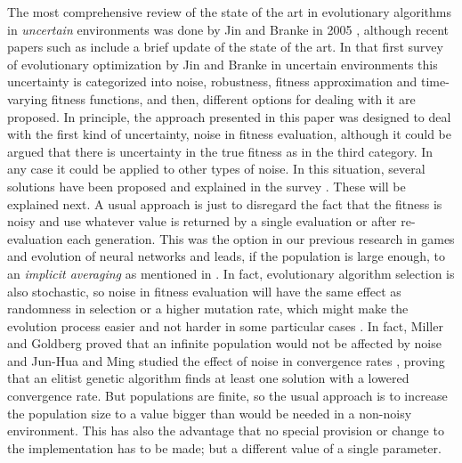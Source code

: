 \documentclass{llncs}
\begin{document}
The most comprehensive review of the state of the art in evolutionary
algorithms in {\em uncertain} environments 
was done by Jin and Branke in 2005 \cite{Jin2005303}, although recent papers such as \cite{DBLP:journals/corr/QianYZ13} include a brief update of the state
of the art. In that first survey 
of evolutionary optimization by Jin and Branke  in
uncertain environments this uncertainty is categorized into noise,
robustness, fitness approximation and time-varying fitness functions, and then,
different options for dealing with it are proposed. In principle, the
approach presented in this paper was designed to deal with the first kind of
uncertainty, noise in fitness evaluation, although it could be argued
that there is uncertainty in the true fitness as in the third
category. In any case it could be applied to
other types of noise. In this situation, several solutions have been
proposed and explained in the survey \cite{Jin2005303}. These will be
explained next.
A usual approach is just to disregard the fact that the fitness is
noisy and use whatever value is returned by a single evaluation or after
re-evaluation each generation. 
This was the option in our
previous research in games and evolution of neural networks \cite{castilloGECCO99,bots:evostar,merelo:ESNN} and leads, if
the population is large enough, to an {\em implicit averaging} as
mentioned in \cite{Jin2005303}. In fact, evolutionary algorithm
selection is also stochastic, so noise in fitness evaluation
will have the same effect as randomness in selection or a higher mutation
rate, which might make the evolution process easier and not harder
in some particular cases
\cite{DBLP:journals/corr/QianYZ13}. 
In fact, Miller and Goldberg proved that an infinite population would not
be affected by noise \cite{miller1996genetic} and Jun-Hua and Ming studied the
effect of noise in convergence rates \cite{Junhua20136780}, proving
that an elitist genetic algorithm finds at least one solution with a lowered
convergence rate. But populations are finite, so the usual approach is to increase the population size to a value bigger than would be needed in a non-noisy environment. 
This has also the advantage that no special provision or change to the
implementation has to be made; but a different value of a single parameter.
\end{document}
